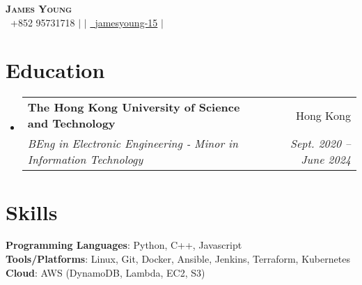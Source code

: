 \documentclass[letterpaper,12pt]{article}
\makeatletter
\newcommand{\resumeSubheading}[4]{
  \vspace{-2pt}\item
    \begin{tabular*}{0.97\textwidth}[t]{l@{\extracolsep{\fill}}r}
      \textbf{#1} & #2 \\
      \textit{\small#3} & \textit{\small #4} \\
    \end{tabular*}\vspace{-7pt}
}
\newcommand{\resumeSubHeadingListStart}{\begin{itemize}[leftmargin=0.05in, label={}]}
\newcommand{\resumeSubHeadingListEnd}{\end{itemize}}
\makeatother
\begin{document}
\begin{center}
    \textbf{\Huge \scshape James Young} \\ \vspace{2pt}
    \small  \faPhone\ {+852 95731718} $|$ 
    \href{mailto:jyyoungaa@connect.ust.hk}{} $|$ 
    \href{https://github.com/jamesyoung-15} {\faGithub\ {jamesyoung-15}} $|$
    \href{https://linkedin.com/in/jamesyyoung}{}
\end{center}


\section{Education}
  \resumeSubHeadingListStart
    \resumeSubheading
      {The Hong Kong University of Science and Technology}{Hong Kong}
      {BEng in Electronic Engineering - Minor in Information Technology}{Sept. 2020 -- June 2024}
  \resumeSubHeadingListEnd


\section{Skills}
 \begin{itemize}[leftmargin=0.15in, label={}]
    \small{\item{
     \textbf{Programming Languages}{: Python, C++, Javascript} \\
     \textbf{Tools/Platforms}{: Linux, Git, Docker, Ansible, Jenkins, Terraform, Kubernetes} \\ 
     \textbf{Cloud}{: AWS (DynamoDB, Lambda, EC2, S3)} \\
    }}
 \end{itemize}
\end{document}
